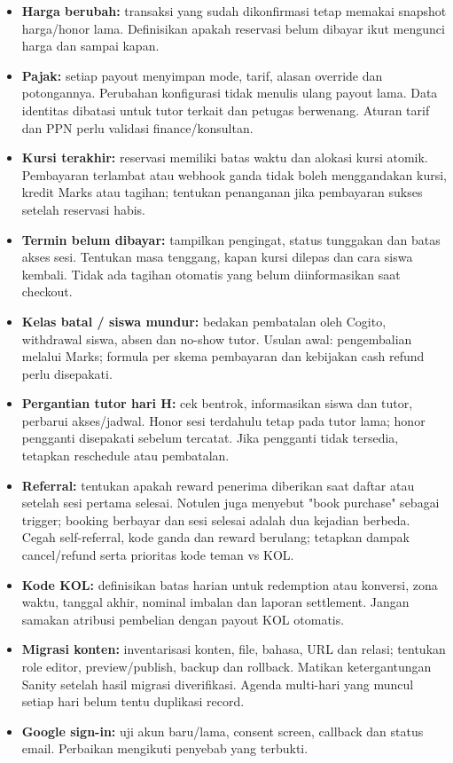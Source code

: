 \documentclass[10pt,a4paper]{article}
\begin{document}
\begin{itemize}
\item \textbf{Harga berubah:} transaksi yang sudah dikonfirmasi tetap memakai snapshot harga/\allowbreak{}honor lama. Definisikan apakah reservasi belum dibayar ikut mengunci harga dan sampai kapan.
\item \textbf{Pajak:} setiap payout menyimpan mode, tarif, alasan override dan potongannya. Perubahan konfigurasi tidak menulis ulang payout lama. Data identitas dibatasi untuk tutor terkait dan petugas berwenang. Aturan tarif dan PPN perlu validasi finance/\allowbreak{}konsultan.
\item \textbf{Kursi terakhir:} reservasi memiliki batas waktu dan alokasi kursi atomik. Pembayaran terlambat atau webhook ganda tidak boleh menggandakan kursi, kredit Marks atau tagihan; tentukan penanganan jika pembayaran sukses setelah reservasi habis.
\item \textbf{Termin belum dibayar:} tampilkan pengingat, status tunggakan dan batas akses sesi. Tentukan masa tenggang, kapan kursi dilepas dan cara siswa kembali. Tidak ada tagihan otomatis yang belum diinformasikan saat checkout.
\item \textbf{Kelas batal /\allowbreak{} siswa mundur:} bedakan pembatalan oleh Cogito, withdrawal siswa, absen dan no-show tutor. Usulan awal: pengembalian melalui Marks; formula per skema pembayaran dan kebijakan cash refund perlu disepakati.
\item \textbf{Pergantian tutor hari H:} cek bentrok, informasikan siswa dan tutor, perbarui akses/\allowbreak{}jadwal. Honor sesi terdahulu tetap pada tutor lama; honor pengganti disepakati sebelum tercatat. Jika pengganti tidak tersedia, tetapkan reschedule atau pembatalan.
\item \textbf{Referral:} tentukan apakah reward penerima diberikan saat daftar atau setelah sesi pertama selesai. Notulen juga menyebut "book purchase" sebagai trigger; booking berbayar dan sesi selesai adalah dua kejadian berbeda. Cegah self-referral, kode ganda dan reward berulang; tetapkan dampak cancel/\allowbreak{}refund serta prioritas kode teman vs KOL.
\item \textbf{Kode KOL:} definisikan batas harian untuk redemption atau konversi, zona waktu, tanggal akhir, nominal imbalan dan laporan settlement. Jangan samakan atribusi pembelian dengan payout KOL otomatis.
\item \textbf{Migrasi konten:} inventarisasi konten, file, bahasa, URL dan relasi; tentukan role editor, preview/\allowbreak{}publish, backup dan rollback. Matikan ketergantungan Sanity setelah hasil migrasi diverifikasi. Agenda multi-hari yang muncul setiap hari belum tentu duplikasi record.
\item \textbf{Google sign-in:} uji akun baru/\allowbreak{}lama, consent screen, callback dan status email. Perbaikan mengikuti penyebab yang terbukti.
\end{itemize}
\end{document}

